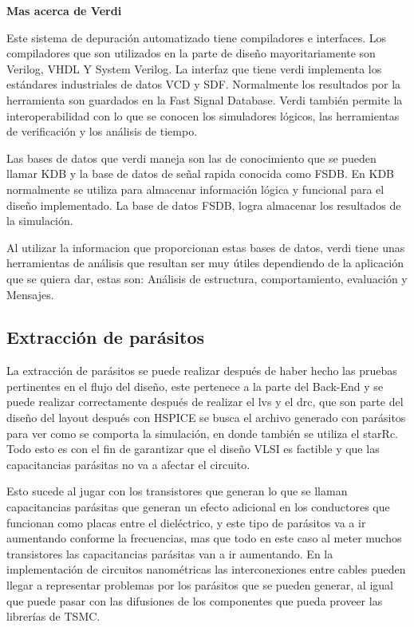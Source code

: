  \cite{Jeff} 

\textbf{Mas acerca de Verdi}

Este sistema de depuración automatizado tiene compiladores e interfaces.
Los compiladores que son utilizados en la parte de diseño mayoritariamente son Verilog, VHDL Y System Verilog. La interfaz que tiene verdi implementa los estándares industriales de datos VCD y SDF. Normalmente los resultados por la herramienta son guardados en la Fast Signal Database.  Verdi también permite la interoperabilidad con lo que se conocen los simuladores lógicos, las herramientas de verificación y los análisis de tiempo.

Las bases de datos que verdi maneja son las de conocimiento que se pueden llamar KDB y la base de datos de señal rapida conocida como FSDB. En KDB normalmente se utiliza para almacenar información lógica y funcional para el diseño implementado.
La base de datos FSDB, logra almacenar los resultados de la simulación.

Al utilizar la informacion que proporcionan estas bases de datos, verdi tiene unas herramientas de análisis que resultan ser muy útiles dependiendo de la aplicación que se quiera dar, estas son: Análisis de estructura, comportamiento, evaluación y Mensajes.


  \subsection{Extracción de parásitos}

La extracción de parásitos se puede realizar después de haber hecho las pruebas pertinentes en el flujo del diseño, este pertenece a la parte del Back-End y se puede realizar correctamente después de realizar el lvs y el drc, que son parte del diseño del layout después con HSPICE se busca el archivo generado con parásitos para ver como se comporta la simulación, en donde también se utiliza el starRc. Todo esto es con el fin de garantizar que el diseño VLSI es factible y que las capacitancias parásitas no va a afectar el circuito.

Esto sucede al jugar con los transistores que generan lo que se llaman capacitancias parásitas que generan un efecto adicional en los conductores que funcionan como placas entre el dieléctrico, y este tipo de parásitos va a ir aumentando conforme la frecuencias, mas que todo en este caso al meter muchos transistores las capacitancias parásitas van a ir aumentando.  En la implementación de circuitos nanométricas las interconexiones entre cables pueden llegar a representar problemas por los parásitos que se pueden generar, al igual que puede pasar con las difusiones de los componentes que pueda proveer las librerías de TSMC.

